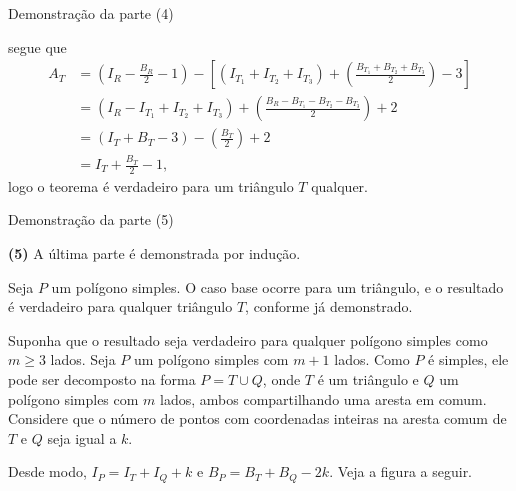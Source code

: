 \begin{frame}[fragile]{Demonstração da parte (4)}

    segue que
    \begin{align*}
        A_T &= \left( I_R - \frac{B_R}{2} - 1\right) - \left[
        \left( I_{T_1} + I_{T_2} + I_{T_3} \right) +
        \left( \frac{B_{T_1} + B_{T_2} + B_{T_3}}{2}\right) - 3\right] \\
        &= \left(I_R - I_{T_1} + I_{T_2} + I_{T_3} \right) +
        \left( \frac{B_R - B_{T_1} - B_{T_2} - B_{T_3}}{2}\right) + 2\\
        &= \left(I_T + B_T - 3 \right) -
        \left( \frac{B_T}{2}\right) + 2\\
        &= I_T + \frac{B_T}{2} - 1,
    \end{align*}
    logo o teorema é verdadeiro para um triângulo $T$ qualquer.

\end{frame}

\begin{frame}[fragile]{Demonstração da parte (5)}

    \textbf{(5)} A última parte é demonstrada por indução. 

    Seja $P$ um polígono simples. O caso base ocorre para um triângulo, e o resultado é 
    verdadeiro para qualquer triângulo $T$, conforme já demonstrado.

    Suponha que o resultado seja verdadeiro para qualquer polígono simples como $m\geq 3$ lados.
    Seja $P$ um polígono simples com $m + 1$ lados. Como $P$ é simples, ele pode ser 
        decomposto na forma $P = T\cup Q$, onde $T$ é um triângulo e $Q$ um polígono simples
        com $m$ lados, ambos compartilhando uma aresta em comum. Considere que o número de
        pontos com coordenadas inteiras na aresta comum de $T$ e $Q$ seja igual a $k$.

    Desde modo, $I_P = I_T + I_Q + k$ e $B_P = B_T + B_Q - 2k$. Veja a figura a seguir.

\end{frame}

